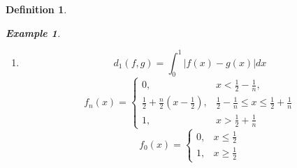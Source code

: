 \documentclass{article}
\newtheorem*{property}{Property}
\newtheorem*{definition}{Definition}
\newtheorem*{example}{Example}
\begin{document}
\begin{definition}
\begin{example}
\begin{enumerate}
\begin{property}
                $\|f\|_0=\sup_{0 \le x \le 1}{|f(x)|}, (C(\bigl[0, 1\bigr]), \|f_0\|)$ is a Banach space.
                \begin{proof}
                    Let $\{f_n\}$ be a Cauchy sequence, $\forall \epsilon > 0, \exists N > 0$, s.t.
                    $d_0(f_n, f_m) = \sup_{0 \le x \le 1}|f_n(x) - f_m(x)| < \epsilon$.
                    Then for any fixed $x \in [0, 1]$, the sequence (of scalars) $\{f_n(x)\}$ is a Cauchy sequence in R.
                    It follows that there exists $f_0(x)$ s.t. $f_n(x) \rightarrow f_0(x)$(use Completeness of $\mathbb{R}$).
                    Since $|f_n(x) - f_m(x)| < \epsilon$. letting $m \rightarrow \infty$ we get
                    $|f_n(x) - f_0(x)| \le \epsilon, \forall n > N, \forall x \in X$.
                    So the sequence of functions $\{f_n(x)\}$ converges uniformly to $f_0(x)$, 
                    because $\forall x \in X$.
                    By results in mathmatical analysis, $f_0$ is continuous and 
                    $f_n \rightarrow f_0(\sup_{0 \le x \le 1}{|f_n(x) - f_0(x)|} < \epsilon, \forall n > N)$ 
                    in $(C([0, 1]), d_0)$
                    (Finally, since each \(f_n\) is continuous and the uniform limit of continuous functions is continuous, 
                    \(f\in C([0,1])\).
                    We have thus found a limit \(f\in C([0,1])\) of the Cauchy sequence \(\{f_n\}\) in the metric \(d_0\).  
                    This shows \((C([0,1]),d_0)\) is complete. See the proof in appendix)
                \end{proof}
            \end{property}
            \item \[
                d_1(f, g) = \int_{0}^{1}{|f(x) - g(x)|dx}
            \]
            \[
                f_n(x) = 
                \begin{cases}
                    0, & x < \frac{1}{2} - \frac{1}{n}, \\
                    \frac{1}{2} + \frac{n}{2}(x - \frac{1}{2}), & \frac{1}{2} - \frac{1}{n} \le x \le \frac{1}{2} + \frac{1}{n} \\
                    1, & x > \frac{1}{2} + \frac{1}{n}
                \end{cases}
            \]
            \[
                f_0(x) =
                    \begin{cases}
                        0, & x \le \frac{1}{2} \\
                        1, & x \ge \frac{1}{2}
                    \end{cases}
\]
\end{enumerate}
\end{example}
\end{definition}
\end{document}
